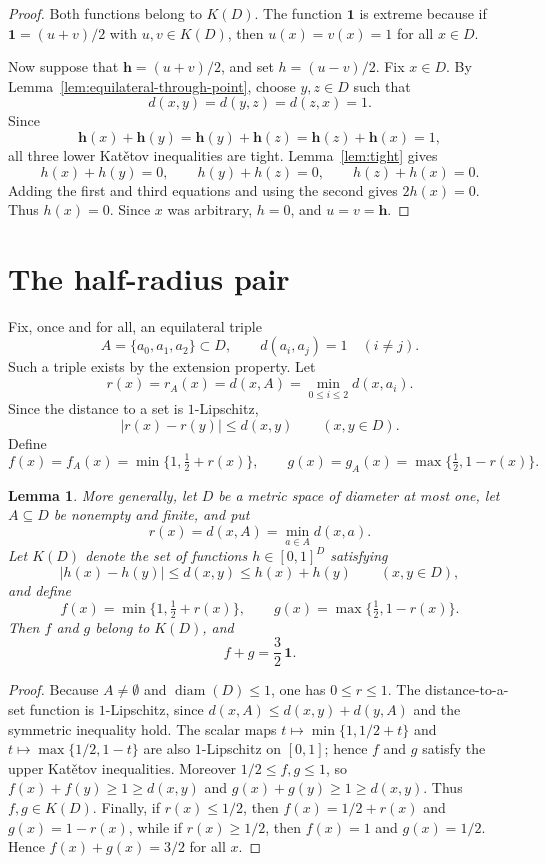 \documentclass{proc-l}
\numberwithin{equation}{section}
\newtheorem{lemma}[theorem]{Lemma}
\theoremstyle{definition}
\theoremstyle{remark}
\newcommand{\one}{\mathbf 1}
\newcommand{\half}{\mathbf h}
\newcommand{\diam}{\operatorname{diam}}
\begin{document}
\begin{proof}
Both functions belong to \(K(D)\).  The function \(\one\) is extreme because if
\(\one=(u+v)/2\) with \(u,v\in K(D)\), then \(u(x)=v(x)=1\) for all \(x\in D\).

Now suppose that \(\half=(u+v)/2\), and set \(h=(u-v)/2\).  Fix \(x\in D\).
By Lemma~\ref{lem:equilateral-through-point}, choose \(y,z\in D\) such that
\[
        d(x,y)=d(y,z)=d(z,x)=1.
\]
Since
\[
        \half(x)+\half(y)
        =
        \half(y)+\half(z)
        =
        \half(z)+\half(x)
        =1,
\]
all three lower Kat\v{e}tov inequalities are tight.  Lemma~\ref{lem:tight} gives
\[
        h(x)+h(y)=0,
        \qquad
        h(y)+h(z)=0,
        \qquad
        h(z)+h(x)=0.
\]
Adding the first and third equations and using the second gives \(2h(x)=0\).
Thus \(h(x)=0\).  Since \(x\) was arbitrary, \(h=0\), and \(u=v=\half\).
\end{proof}

\section{The half-radius pair}
\label{sec:radius}

Fix, once and for all, an equilateral triple
\[
        A=\{a_0,a_1,a_2\}\subset D,
        \qquad
        d(a_i,a_j)=1\quad(i\ne j).
\]
Such a triple exists by the extension property.  Let
\[
        r(x)=r_A(x)=d(x,A)=\min_{0\le i\le2}d(x,a_i).
\]
Since the distance to a set is \(1\)-Lipschitz,
\[
        |r(x)-r(y)|\le d(x,y)\qquad(x,y\in D).
\]
Define
\begin{equation}\label{eq:def-fg}
        f(x)=f_A(x)=\min\{1,\tfrac12+r(x)\},
        \qquad
        g(x)=g_A(x)=\max\{\tfrac12,1-r(x)\}.
\end{equation}

\begin{lemma}\label{lem:fg-in-K}
More generally, let \(D\) be a metric space of diameter at most one, let
\(A\subseteq D\) be nonempty and finite, and put
\[
        r(x)=d(x,A)=\min_{a\in A}d(x,a).
\]
Let \(K(D)\) denote the set of functions \(h\in[0,1]^D\) satisfying
\[
        |h(x)-h(y)|\le d(x,y)\le h(x)+h(y)
        \qquad(x,y\in D),
\]
and define
\[
        f(x)=\min\{1,\tfrac12+r(x)\},
        \qquad
        g(x)=\max\{\tfrac12,1-r(x)\}.
\]
Then \(f\) and \(g\) belong to \(K(D)\), and
\[
        f+g=\frac32\,\one.
\]
\end{lemma}

\begin{proof}
Because \(A\ne\emptyset\) and \(\diam(D)\le1\), one has \(0\le r\le1\).  The
distance-to-a-set function is \(1\)-Lipschitz, since
\(d(x,A)\le d(x,y)+d(y,A)\) and the symmetric inequality hold.  The scalar maps
\(t\mapsto\min\{1,1/2+t\}\) and \(t\mapsto\max\{1/2,1-t\}\) are also
\(1\)-Lipschitz on \([0,1]\); hence \(f\) and \(g\) satisfy the upper Kat\v{e}tov
inequalities.  Moreover \(1/2\le f,g\le1\), so
\(f(x)+f(y)\ge1\ge d(x,y)\) and \(g(x)+g(y)\ge1\ge d(x,y)\).  Thus
\(f,g\in K(D)\).  Finally, if \(r(x)\le1/2\), then
\(f(x)=1/2+r(x)\) and \(g(x)=1-r(x)\), while if \(r(x)\ge1/2\), then
\(f(x)=1\) and \(g(x)=1/2\).  Hence \(f(x)+g(x)=3/2\) for all \(x\).
\end{proof}
\end{document}
